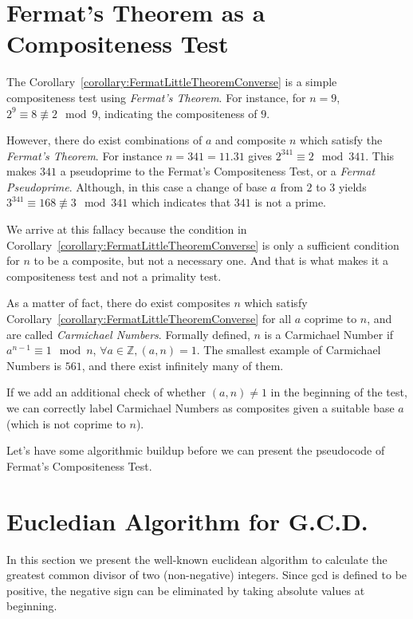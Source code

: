 \documentclass[11pt]{article}
\begin{document}
\section{Fermat's Theorem as a Compositeness Test}

The Corollary~\ref{corollary:FermatLittleTheoremConverse} is a simple compositeness test using \emph{Fermat's Theorem}. For instance, for $n = 9$, $2^9 \equiv 8 \not\equiv 2 \mod 9$, indicating the compositeness of $9$.

However, there do exist combinations of $a$ and composite $n$ which satisfy the \emph{Fermat's Theorem}. For instance $n = 341 = 11.31$ gives $2^{341} \equiv 2 \mod 341$. This makes $341$ a pseudoprime to the Fermat's Compositeness Test, or a \emph{Fermat Pseudoprime}. Although, in this case a change of base $a$ from $2$ to $3$ yields $3^{341} \equiv 168 \not\equiv 3 \mod 341$ which indicates that $341$ is not a prime.

We arrive at this fallacy because the condition in Corollary~\ref{corollary:FermatLittleTheoremConverse} is only a sufficient condition for $n$ to be a composite, but not a necessary one. And that is what makes it a compositeness test and not a primality test.

As a matter of fact, there do exist composites $n$ which satisfy Corollary~\ref{corollary:FermatLittleTheoremConverse} for all $a$ coprime to $n$, and are called \emph{Carmichael Numbers}. Formally defined, $n$ is a Carmichael Number if $a^{n-1} \equiv 1 \mod n$, $\forall a \in \mathbb{Z}, (a,n) = 1$. The smallest example of Carmichael Numbers is $561$, and there exist infinitely many of them. 

If we add an additional check of whether $(a,n) \neq 1$ in the beginning of the test, we can correctly label Carmichael Numbers as composites given a suitable base $a$ (which is not coprime to $n$).

Let's have some algorithmic buildup before we can present the pseudocode of Fermat's Compositeness Test.

\section{Eucledian Algorithm for G.C.D.}

In this section we present the well-known euclidean algorithm to calculate the greatest common divisor of two (non-negative) integers. Since gcd is defined to be positive, the negative sign can be eliminated by taking absolute values at beginning.
\end{document}
